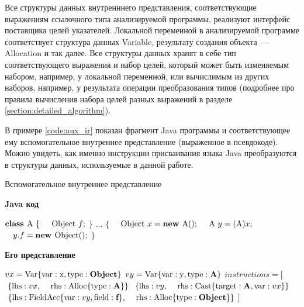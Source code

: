 \documentclass[14pt,titlepage]{extarticle}
\newcommand{\algorithmictitle}[1]{\hspace{8mm}\textbf{#1}}
\newcommand{\eng}[1]{{\English#1}}
\begin{document}
    Все структуры данных внутренннего представления, соответствующие выражениям
    ссылочного типа анализируемой программы, реализуют интерфейс поставщика
    целей указателей.
    Локальной переменной в анализируемой программе соответствует структура
    данных \eng{Variable}, результату создания объекта~--- \eng{Allocation} и
    так далее.
    Все структуры данных хранят в себе тип соответствующего выражения и набор
    целей, который может быть изменяемым набором, например, у локальной
    переменной, или вычислимым из других наборов, например, у результата
    операции преобразования типов (подробнее про правила вычисления набора
    целей разных выражений в разделе \ref{section:detailed_algorithm}).

    В примере \ref{code:aux_ir} показан фрагмент Java программы и
    соответствующее ему вспомогательное внутреннее представление (выраженное в
    псевдокоде).
    Можно увидеть, как именно инструкции присваивания языка Java преобразуются
    в структуры данных, используемые в данной работе.

    \begin{algorithm}
      \caption{Вспомогательное внутреннее представление}
      \label{code:aux_ir}
      \begin{multicols*}{2}
        \algorithmictitle{Java код}
        \begin{algorithmic}
          \STATE $\textbf{class }\textmd{A } \{$
          \STATE $\textmd{\quad Object }f;$
          \STATE $\}$
          \STATE $...$
          \STATE $\{$
          \STATE $\textmd{\quad Object }x = \textbf{new }\textmd{A}();$
          \STATE $\textmd{\quad A }y = (\textmd{A})x;$
          \STATE $\textmd{\quad}y.f = \textbf{new }\textmd{Object}();$
          \STATE $\}$
        \end{algorithmic}
        \columnbreak
        \algorithmictitle{Его представление}
        \begin{algorithmic}
          \STATE $vx = \textmd{Var}\{\textmd{var}: \textmd{x},%
                            \textmd{type}: \textbf{Object}\}$
          \STATE $vy = \textmd{Var}\{\textmd{var}: \textmd{y},%
                            \textmd{type}: \textbf{A}\}$
          \STATE $instructions = [$
          \STATE $\textmd{\ }\{ \textmd{lhs}: vx,$
          \STATE $\textmd{\ \, rhs}: \textmd{Alloc}\{\textmd{type}: \textbf{A}\}\}$
          \STATE $\textmd{\ }\{ \textmd{lhs}: vy,$
          \STATE $\textmd{\ \, rhs}: \textmd{Cast}\{\textmd{target}: \textbf{A}, \textmd{var}: vx\}\}$
          \STATE $\textmd{\ }\{ \textmd{lhs}: \textmd{FieldAcc}\{\textmd{var}: vy, \textmd{field}: \textbf{f}\},$
          \STATE $\textmd{\ \, rhs}: \textmd{Alloc}\{\textmd{type}: \textbf{Object}\}\}$
          \STATE $]$
        \end{algorithmic}
      \end{multicols*}
    \end{algorithm}
\end{document}

